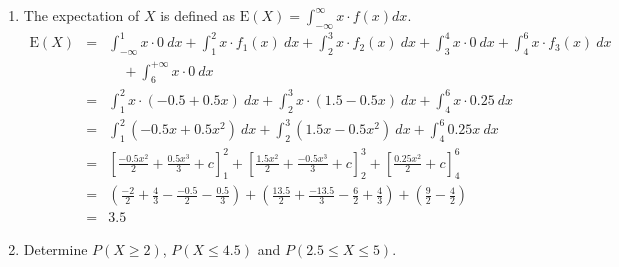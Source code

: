 \documentclass[12pt,thmsa]{article}\usepackage[]{graphicx}\usepackage[]{color}
\begin{document}
\begin{enumerate}
\item The expectation of $X$ is defined as $\text{E}(X) = \int_{-\infty}^{\infty} x \cdot f(x) dx$.
  \begin{eqnarray*}
   \text{E}(X) &=& \int_{-\infty}^1 x \cdot 0 \ dx +
    \int_{1}^2 x \cdot f_{1}(x) \ dx +
    \int_{2}^3 x \cdot f_{2}(x) \ dx +
    \int_{3}^4 x \cdot 0 \ dx +
    \int_{4}^6 x \cdot f_{3}(x) \ dx\\
   && \quad +    \int_{6}^{+\infty} x \cdot 0 \ dx \\
    &=& \int_{1}^2 x \cdot (-0.5 + 0.5x) \ dx +
    \int_{2}^3 x \cdot (1.5-0.5x) \ dx +\int_{4}^6 x \cdot 0.25 \ dx \\
    &=& \int_{1}^{2} (-0.5x + 0.5x^2) \ dx +
    \int_{2}^{3} (1.5x - 0.5x^2) \ dx +
    \int_{4}^{6}0.25x \ dx \\
    &=& \left[ \frac{-0.5x^2}{2} + \frac{0.5x^3}{3} + c
    \right]^{2}_{1} +
    \left[ \frac{1.5x^2}{2} + \frac{-0.5x^3}{3} + c
    \right]^{3}_{2} +
    \left[ \frac{0.25x^2}{2} + c
    \right]^{6}_{4} \\
    &=& \left(\frac{-2}{2} + \frac{4}{3} - \frac{-0.5}{2}
      -\frac{0.5}{3} \right)
    + \left( \frac{13.5}{2} + \frac{-13.5}{3} - \frac{6}{2} +
      \frac{4}{3} \right)
    + \left( \frac{9}{2} - \frac{4}{2} \right) \\
    &=& {3.5}
  \end{eqnarray*}


%
%


\item Determine $P(X \ge 2)$, $P(X \le 4.5)$ and $P(2.5 \le X \le 5)$.


\end{enumerate}
\end{document}
